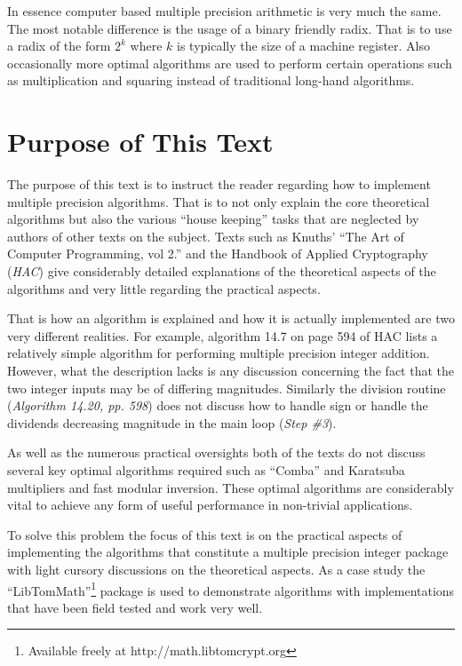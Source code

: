 \documentclass[b5paper]{book}
\begin{document}
In essence computer based multiple precision arithmetic is very much the same.  The most notable difference is the usage
of a binary friendly radix.  That is to use a radix of the form $2^k$ where $k$ is typically the size of a machine 
register.  Also occasionally more optimal algorithms are used to perform certain operations such as multiplication and 
squaring instead of traditional long-hand algorithms.

\section{Purpose of This Text}
The purpose of this text is to instruct the reader regarding how to implement multiple precision algorithms.  That is 
to not only explain the core theoretical algorithms but also the various ``house keeping'' tasks that are neglected by
authors of other texts on the subject.  Texts such as Knuths' ``The Art of Computer Programming, vol 2.'' and the 
Handbook of Applied Cryptography (\textit{HAC}) give considerably detailed explanations of the theoretical aspects of 
the algorithms and very little regarding the practical aspects.  

That is how an algorithm is explained and how it is actually implemented are two very different 
realities.  For example, algorithm 14.7 on page 594 of HAC lists a relatively simple algorithm for performing multiple 
precision integer addition.  However, what the description lacks is any discussion concerning the fact that the two 
integer inputs may be of differing magnitudes.  Similarly the division routine (\textit{Algorithm 14.20, pp. 598}) 
does not discuss how to handle sign or handle the dividends decreasing magnitude in the main loop (\textit{Step \#3}).

As well as the numerous practical oversights both of the texts do not discuss several key optimal algorithms required 
such as ``Comba'' and Karatsuba multipliers and fast modular inversion.  These optimal algorithms are considerably
vital to achieve any form of useful performance in non-trivial applications.  

To solve this problem the focus of this text is on the practical aspects of implementing the algorithms that 
constitute a multiple precision integer package with light cursory discussions on the theoretical aspects.  As a case 
study the ``LibTomMath''\footnote{Available freely at http://math.libtomcrypt.org} package is used to demonstrate 
algorithms with implementations that have been field tested and work very well.
\end{document}

